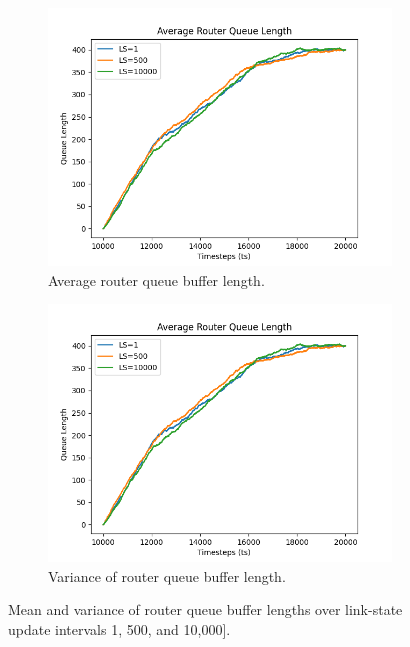 \captionsetup{justification=centering}
\begin{figure}[H]
    \centering
    \begin{subfigure}{0.475\textwidth}
        \includegraphics[width=\textwidth]{figs/results/average_of_1,500,10000.png}
        \caption{Average router queue buffer length.}
        \label{fig:Ravgq}
    \end{subfigure}
    \hfill
    \begin{subfigure}{0.475\textwidth}
        \includegraphics[width=\textwidth]{figs/results/average_of_1,500,10000.png}
        \caption[]{Variance of router queue buffer length.}
        \label{fig:Rvarq}
    \end{subfigure}
    \caption{Mean and variance of router queue buffer lengths over link-state update intervals 1, 500, and 10,000].}
\end{figure}

